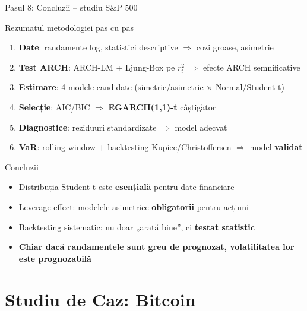 \documentclass[9pt, aspectratio=169, t]{beamer}
\begin{document}
\begin{frame}{Pasul 8: Concluzii -- studiu S\&P 500}
    \small
        \begin{block}{Rezumatul metodologiei pas cu pas}
            \begin{enumerate}\setlength{\itemsep}{2pt}
                \item \textbf{Date}: randamente log, statistici descriptive $\Rightarrow$ cozi groase, asimetrie
                \item \textbf{Test ARCH}: ARCH-LM + Ljung-Box pe $r_t^2$ $\Rightarrow$ efecte ARCH semnificative
                \item \textbf{Estimare}: 4 modele candidate (simetric/asimetric $\times$ Normal/Student-t)
                \item \textbf{Selecție}: AIC/BIC $\Rightarrow$ \textbf{EGARCH(1,1)-t} câștigător
                \item \textbf{Diagnostice}: reziduuri standardizate $\Rightarrow$ model adecvat
                \item \textbf{VaR}: rolling window + backtesting Kupiec/Christoffersen $\Rightarrow$ model \textbf{validat}
            \end{enumerate}
        \end{block}
        \vspace{0.1cm}
        \begin{alertblock}{Concluzii}
            \begin{itemize}
                \item Distribuția Student-t este \textbf{esențială} pentru date financiare
                \item Leverage effect: modelele asimetrice \textbf{obligatorii} pentru acțiuni
                \item Backtesting sistematic: nu doar „arată bine'', ci \textbf{testat statistic}
                \item \textbf{Chiar dacă randamentele sunt greu de prognozat, volatilitatea lor este prognozabilă}
            \end{itemize}
        \end{alertblock}
\end{frame}

\section{Studiu de Caz: Bitcoin}
\end{document}
